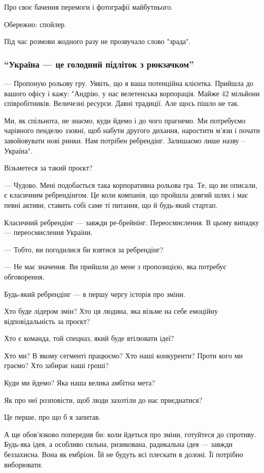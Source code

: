 Про своє бачення перемоги і фотографії майбутнього.

Обережно: спойлер. 

Під час розмови жодного разу не прозвучало слово "зрада". 

\subsubsection{\enquote{Україна --- це голодний підліток з рюкзачком}}

--- Пропоную рольову гру. Уявіть, що я ваша потенційна клієнтка. Прийшла до
вашого офісу і кажу: "Андрію, у нас велетенська корпорація. Майже 42 мільйони
співробітників. Величезні ресурси. Давні традиції. Але щось пішло не так.

Ми, як спільнота, не знаємо, куди йдемо і до чого прагнемо. Ми потребуємо
чарівного пенделю ззовні, щоб набути другого дихання, наростити м’язи і почати
завойовувати нові ринки. Нам потрібен ребрендінг. Залишаємо лише назву –
Україна".

Візьметеся за такий проєкт?

--- Чудово. Мені подобається така корпоративна рольова гра. Те, що ви описали, є
класичним ребрендінгом. Це коли компанія, що пройшла довгий шлях і має певні
активи, ставить собі саме ті питання, що й будь-який стартап.

Класичний ребрендінг --- завжди ре-брейнінг. Переосмислення. В цьому випадку ---
переосмислення України.

--- Тобто, ви погодилися би взятися за ребрендінг?

--- Не має значення. Ви прийшли до мене з пропозицією, яка потребує обговорення.

Будь-який ребрендінг --- в першу чергу історія про зміни.

Хто буде лідером змін? Хто ця людина, яка візьме на себе емоційну
відповідальність за проєкт?

Хто є команда, той спецназ, який буде втілювати ідеї?

Хто ми? В якому сегменті працюємо? Хто наші конкуренти? Проти кого ми граємо?
Хто забирає наші гроші?

Куди ми йдемо? Яка наша велика амбітна мета?

Як про неї розповісти, щоб люди захотіли до нас приєднатися?

Це перше, про що б я запитав.

А ще обов’язково попередив би: коли йдеться про зміни, готуйтеся до спротиву.
Будь-яка ідея, а особливо сильна, ризикована, радикальна ідея --- завжди
беззахисна. Вона як ембріон. Їй не будуть всі плескати в долоні. Її потрібно
виборювати.

